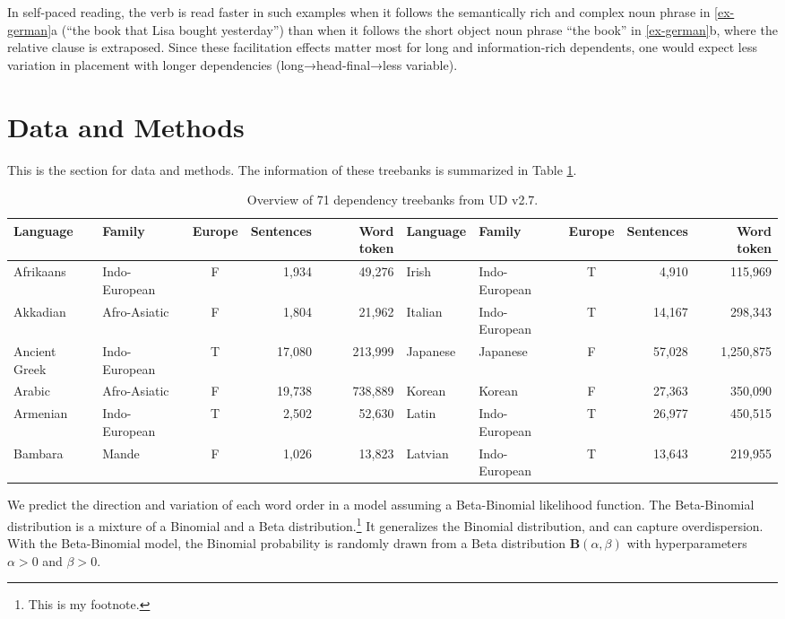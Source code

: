 \documentclass[10pt,a4paper,]{article}
\begin{document}
In self-paced reading, the verb is read faster in such examples when it
follows the semantically rich and complex noun phrase in
\ref{ex-german}a (``the book that Lisa bought yesterday'') than when it
follows the short object noun phrase ``the book'' in \ref{ex-german}b,
where the relative clause is extraposed. Since these facilitation
effects matter most for long and information-rich dependents, one would
expect less variation in placement with longer dependencies
(long→head-final→less variable).

\section{Data and Methods}\label{data-and-methods}

This is the section for data and methods. The information of these
treebanks is summarized in Table \ref{tab:UD-data}.

\begin{center}
\setlength\tabcolsep{2pt}
\begin{ThreePartTable}
\footnotesize
\begin{longtable}[h]{llcrr|llcrr}
\caption{Overview of 71 dependency treebanks from UD v2.7.\label{tab:UD-data}} \\
\hline
\endfirsthead
\toprule
\endhead
\vspace{-0.05cm}
Language & Family & Europe & Sentences & Word token & Language & Family & Europe & Sentences & Word token\\
\midrule
Afrikaans & Indo-European & F & 1,934 & 49,276 & Irish & Indo-European & T & 4,910 & 115,969\\
Akkadian & Afro-Asiatic & F & 1,804 & 21,962 & Italian & Indo-European & T & 14,167 & 298,343\\
Ancient Greek & Indo-European & T & 17,080 & 213,999 & Japanese & Japanese & F & 57,028 & 1,250,875\\
Arabic & Afro-Asiatic & F & 19,738 & 738,889 & Korean & Korean & F & 27,363 & 350,090\\
Armenian & Indo-European & T & 2,502 & 52,630 & Latin & Indo-European & T & 26,977 & 450,515\\
Bambara & Mande & F & 1,026 & 13,823 & Latvian & Indo-European & T & 13,643 & 219,955\\
\bottomrule
\end{longtable}
\end{ThreePartTable}
\end{center}

We predict the direction and variation of each word order in a model
assuming a Beta-Binomial likelihood function. The Beta-Binomial
distribution is a mixture of a Binomial and a Beta
distribution.\footnote{This is my footnote.} It generalizes the Binomial
distribution, and can capture overdispersion. With the Beta-Binomial
model, the Binomial probability is randomly drawn from a Beta
distribution \(\mathbf{B}\left(\alpha, \beta \right)\) with
hyperparameters \(\alpha > 0\) and \(\beta > 0\).
\end{document}

